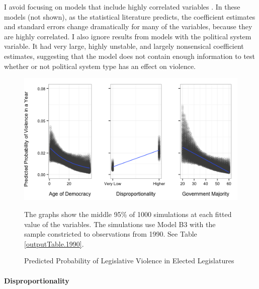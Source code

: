 \documentclass[a4paper]{article}\usepackage{graphicx, color}
\newenvironment{knitrout}{}{} %
\begin{document}
I avoid focusing on models that include highly correlated variables \citep[see][]{Achen2002, Schrodt2006}. In these models (not shown), as the statistical literature predicts, the coefficient estimates and standard errors change dramatically for many of the variables, because they are highly correlated. I also ignore results from models with the political system variable. It had very large, highly unstable, and largely nonsensical coefficient estimates, suggesting that the model does not contain enough information to test \citep{Babyak2004} whether or not political system type has an effect on violence.

\begin{figure}[t]
    \caption{Predicted Probability of Legislative Violence in Elected Legislatures}  
    \label{pred_prob}
    \begin{center}


\begin{knitrout}
\color{fgcolor}
\includegraphics[width=0.8\linewidth]{figure/predProb} 

\end{knitrout}

    \end{center}
    \begin{singlespace}
      {\scriptsize{The graphs show the middle 95\% of 1000 simulations at each fitted value of the variables. The simulations use Model B3 with the sample constricted to observations from 1990. See Table \ref{outputTable.1990}.}}
    \end{singlespace}
\end{figure}

\paragraph{Disproportionality}
\end{document}
